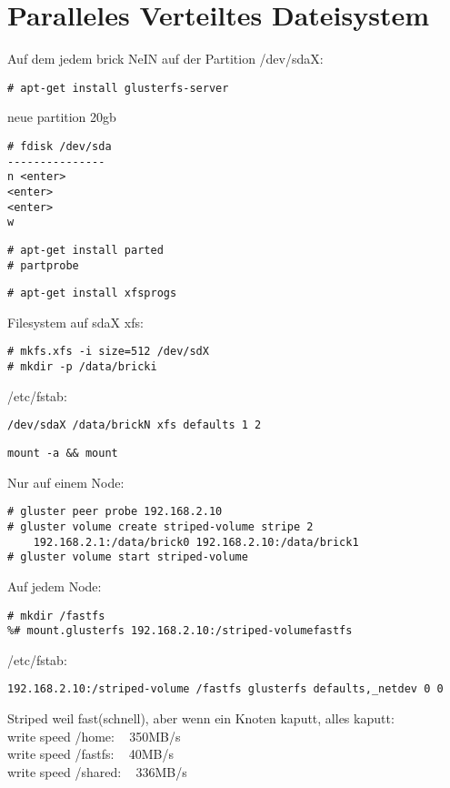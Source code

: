 \section{Paralleles Verteiltes Dateisystem}
Auf dem jedem brick NeIN auf der Partition /dev/sdaX:
\begin{lstlisting}[style=Bash]
# apt-get install glusterfs-server
\end{lstlisting}
neue partition 20gb
\begin{lstlisting}[style=Bash]
# fdisk /dev/sda
---------------
n <enter>
<enter>
<enter>
w
\end{lstlisting}
\begin{lstlisting}[style=Bash]
# apt-get install parted
# partprobe
\end{lstlisting}
\begin{lstlisting}[style=Bash]
# apt-get install xfsprogs
\end{lstlisting}
Filesystem auf sdaX xfs:
\begin{lstlisting}[style=Bash]
# mkfs.xfs -i size=512 /dev/sdX
# mkdir -p /data/bricki
\end{lstlisting}
/etc/fstab:
\begin{lstlisting}[style=Bash]
/dev/sdaX /data/brickN xfs defaults 1 2
\end{lstlisting}
\begin{lstlisting}[style=Bash]
mount -a && mount
\end{lstlisting}
Nur auf einem Node:
\begin{lstlisting}[style=Bash]
# gluster peer probe 192.168.2.10
# gluster volume create striped-volume stripe 2 
    192.168.2.1:/data/brick0 192.168.2.10:/data/brick1
# gluster volume start striped-volume
\end{lstlisting}
Auf jedem Node:
\begin{lstlisting}[style=Bash]
# mkdir /fastfs 
%# mount.glusterfs 192.168.2.10:/striped-volumefastfs
\end{lstlisting}
/etc/fstab:
\begin{lstlisting}[style=Bash]
192.168.2.10:/striped-volume /fastfs glusterfs defaults,_netdev 0 0
\end{lstlisting}
Striped weil fast(schnell), aber wenn ein Knoten kaputt, alles kaputt:\\
write speed /home: ~ 350MB/s\\
write speed /fastfs: ~ 40MB/s\\
write speed /shared: ~ 336MB/s\\
